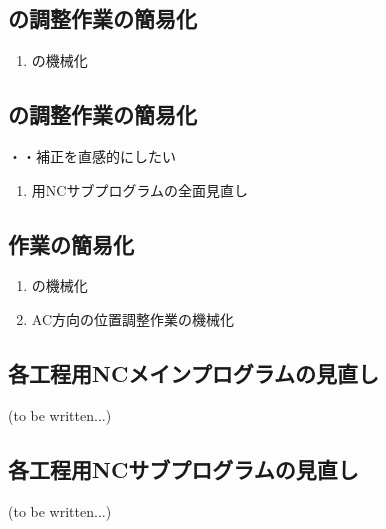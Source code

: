 \subsection{\OutcutMilling の調整作業の簡易化}
\begin{enumerate}[label=\sarrow]
\item \CurvedOutcutMilling の機械化
\end{enumerate}


\subsection{\KeywayMilling の調整作業の簡易化}
・\KeywayPos・\KeywayWidth 補正を直感的にしたい
\begin{enumerate}[label=\sarrow]
\item \KeywayMilling 用NCサブプログラムの全面見直し
\end{enumerate}


\subsection{\EndFaceChamferMilling 作業の簡易化}
\begin{enumerate}[label=\sarrow]
\item \EndFaceChamferMilling の機械化
\item AC方向の位置調整作業の機械化
\end{enumerate}





\subsection{各工程用NCメインプログラムの見直し\TBW}
(to be written...)


\subsection{各工程用NCサブプログラムの見直し\TBW}
(to be written...)



